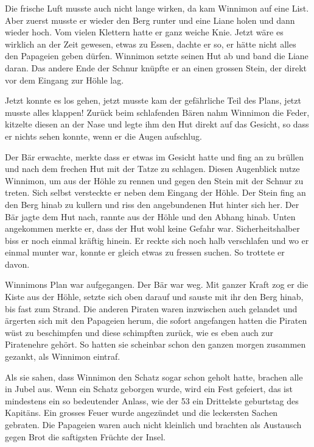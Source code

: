 Die frische Luft musste auch nicht lange wirken, da kam Winnimon auf eine List. Aber zuerst musste er wieder den Berg runter und eine Liane holen und dann wieder hoch. Vom vielen Klettern hatte er ganz weiche Knie. Jetzt wäre es wirklich an der Zeit gewesen, etwas zu Essen, dachte er so, er hätte nicht alles den Papageien geben dürfen. Winnimon setzte seinen Hut ab und band die Liane daran. Das andere Ende der Schnur knüpfte er an einen grossen Stein, der direkt vor dem Eingang zur Höhle lag.

Jetzt konnte es los gehen, jetzt musste kam der gefährliche Teil des Plans, jetzt musste alles klappen! Zurück beim schlafenden Bären nahm Winnimon die Feder, kitzelte diesen an der Nase und legte ihm den Hut direkt auf das Gesicht, so dass er nichts sehen konnte, wenn er die Augen aufschlug.

Der Bär erwachte, merkte dass er etwas im Gesicht hatte und fing an zu brüllen und nach dem frechen Hut mit der Tatze zu schlagen. Diesen Augenblick nutze Winnimon, um aus der Höhle zu rennen und gegen den Stein mit der Schnur zu treten. Sich selbst versteckte er neben dem Eingang der Höhle. Der Stein fing an den Berg hinab zu kullern und riss den angebundenen Hut hinter sich her. Der Bär jagte dem Hut nach, rannte aus der Höhle und den Abhang hinab. Unten angekommen merkte er, dass der Hut wohl keine Gefahr war. Sicherheitshalber biss er noch einmal kräftig hinein. Er reckte sich noch halb verschlafen und wo er einmal munter war, konnte er gleich etwas zu fressen suchen. So trottete er davon.

Winnimons Plan war aufgegangen. Der Bär war weg. Mit ganzer Kraft zog er die Kiste aus der Höhle, setzte sich oben darauf und sauste mit ihr den Berg hinab, bis fast zum Strand. Die anderen Piraten waren inzwischen auch gelandet und ärgerten sich mit den Papageien herum, die sofort angefangen hatten die Piraten wüst zu beschimpfen und diese schimpften zurück, wie es eben auch zur Piratenehre gehört. So hatten sie scheinbar schon den ganzen morgen zusammen gezankt, als Winnimon eintraf.

Als sie sahen, dass Winnimon den Schatz sogar schon geholt hatte, brachen alle in Jubel aus. Wenn ein Schatz geborgen wurde, wird ein Fest gefeiert, das ist mindestens ein so bedeutender Anlass, wie der 53 ein Drittelste geburtstag des Kapitäns. Ein grosses Feuer wurde angezündet und die leckersten Sachen gebraten. Die Papageien waren auch nicht kleinlich und brachten als Austausch gegen Brot die saftigsten Früchte der Insel. 

